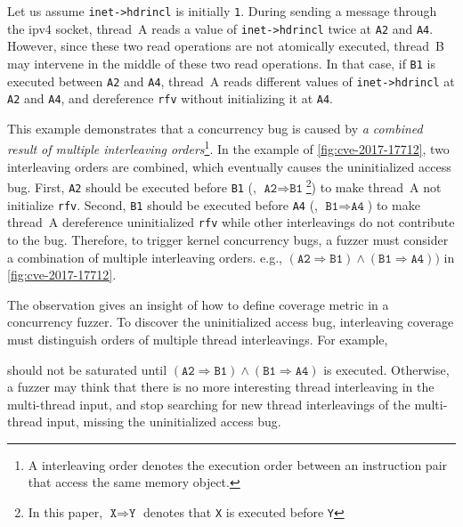 Let us assume \texttt{inet->hdrincl} is initially \texttt{1}.
%
During sending a message through the ipv4 socket, thread~A reads a
value of \texttt{inet->hdrincl} twice at \texttt{A2} and \texttt{A4}.
%
However, since these two read operations are not atomically executed,
thread~B may intervene in the middle of these two read operations.
%
In that case, if \texttt{B1} is executed between \texttt{A2} and
\texttt{A4}, thread~A reads different values of \texttt{inet->hdrincl}
at \texttt{A2} and \texttt{A4}, and dereference \texttt{rfv} without
initializing it at \texttt{A4}.


%
This example demonstrates that a concurrency bug is caused by \textit{a combined
  result of multiple interleaving orders}\footnote{A interleaving order
denotes the execution order between an instruction pair that access
the same memory object.}.
%
In the example of \autoref{fig:cve-2017-17712}, two interleaving orders
are combined, which eventually causes the uninitialized access bug.
%
First, \texttt{A2} should be executed before \texttt{B1} (\ie,
$\texttt{A2} \Rightarrow \texttt{B1}$\footnote{In this paper,
  $\texttt{X} \Rightarrow \texttt{Y}$ denotes that \texttt{X} is
  executed before \texttt{Y}}) to make thread~A not initialize
\texttt{rfv}.
%
Second, \texttt{B1} should be executed before \texttt{A4} (\ie,
$\texttt{B1} \Rightarrow \texttt{A4}$) to make thread~A dereference
uninitialized \texttt{rfv} while other interleavings do not 
contribute to the bug.
%
Therefore, to trigger kernel concurrency bugs, a fuzzer must 
consider a combination of multiple interleaving orders. e.g.,
$(\texttt{A2} \Rightarrow \texttt{B1}) \wedge (\texttt{B1} \Rightarrow
\texttt{A4}))$ in \autoref{fig:cve-2017-17712}.


The observation gives an insight of how to define coverage metric 
in a concurrency fuzzer.
To discover the uninitialized access bug, 
interleaving coverage must distinguish orders of multiple thread interleavings. For example, 

should not be saturated until
$(\texttt{A2} \Rightarrow \texttt{B1}) \wedge (\texttt{B1} \Rightarrow
\texttt{A4})$ is executed.
%
Otherwise, a fuzzer may think that there is no more interesting thread
interleaving in the multi-thread input, and stop searching for new
thread interleavings of the multi-thread input, missing the
uninitialized access bug.


